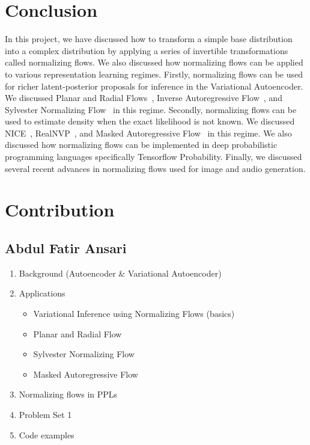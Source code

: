 \documentclass[runningheads]{llncs}
\begin{document}
\section{Conclusion}
In this project, we have discussed how to transform a simple base distribution into a complex distribution by applying a series of invertible transformations called normalizing flows. We also discussed how normalizing flows can be applied to various representation learning regimes. Firstly, normalizing flows can be used for richer latent-posterior proposals for inference in the Variational Autoencoder. We discussed Planar and Radial Flows~\cite{rezende2015variational}, Inverse Autoregressive Flow~\cite{kingma2016improved}, and Sylvester Normalizing Flow~\cite{van2018sylvester} in this regime.  Secondly, normalizing flows can be used to estimate density when the exact likelihood is not known. We discussed NICE~\cite{dinh2014nice}, RealNVP~\cite{dinh2016density}, and Masked Autoregressive Flow~\cite{papamakarios2017masked} in this regime. We also discussed how normalizing flows can be implemented in deep probabilistic programming languages specifically Tensorflow Probability. Finally, we discussed several recent advances in normalizing flows used for image and audio generation.

%
%
%
% 
% 
%

 




\appendix


\section{Contribution}
\subsection*{Abdul Fatir Ansari}
\begin{enumerate}
	\item Background (Autoencoder \& Variational Autoencoder)
	\item Applications
	\begin{itemize}
		\item Variational Inference using Normalizing Flows (basics)
		\item Planar and Radial Flow
		\item Sylvester Normalizing Flow
		\item Masked Autoregressive Flow
	\end{itemize}
	\item Normalizing flows in PPLs
	\item Problem Set 1
	\item Code examples
\end{enumerate}
\end{document}
